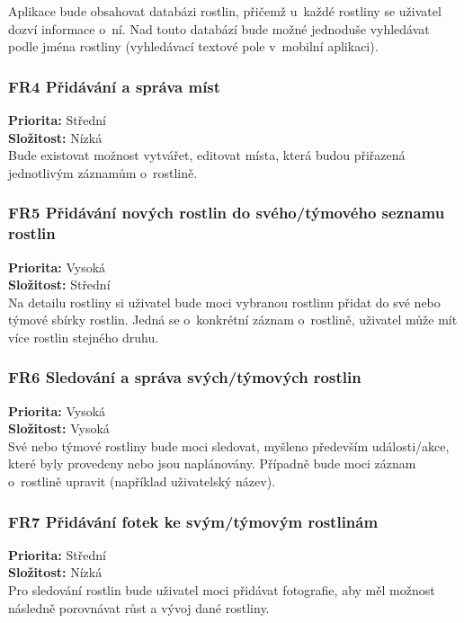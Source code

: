 \documentclass[thesis=M,czech]{FITthesis}[2019/12/23]
\begin{document}
Aplikace bude obsahovat databázi rostlin, přičemž u~každé rostliny se uživatel dozví informace o~ní. Nad touto databází bude možné jednoduše vyhledávat podle jména rostliny (vyhledávací textové pole v~mobilní aplikaci).

\subsubsection*{FR4 Přidávání a správa míst}
\textbf{Priorita:}  Střední \\
\textbf{Složitost:}  Nízká \\

Bude existovat možnost vytvářet, editovat místa, která budou přiřazená jednotlivým záznamům o~rostlině.

\subsubsection*{FR5 Přidávání nových rostlin do svého/týmového seznamu rostlin}
\textbf{Priorita:} Vysoká \\
\textbf{Složitost:}  Střední \\

Na detailu rostliny si uživatel bude moci vybranou rostlinu přidat do své nebo týmové sbírky rostlin. Jedná se o~konkrétní záznam o~rostlině, uživatel může mít více rostlin stejného druhu.

\subsubsection*{FR6 Sledování a správa svých/týmových rostlin}
\textbf{Priorita:} Vysoká \\
\textbf{Složitost:} Vysoká \\

Své nebo týmové rostliny bude moci sledovat, myšleno především události/akce, které byly provedeny nebo jsou naplánovány. Případně bude moci záznam o~rostlině upravit (například uživatelský název).

\subsubsection*{FR7 Přidávání fotek ke svým/týmovým rostlinám}
\textbf{Priorita:} Střední \\
\textbf{Složitost:} Nízká \\

Pro sledování rostlin bude uživatel moci přidávat fotografie, aby měl možnost následně porovnávat růst a vývoj dané rostliny.
\end{document}

